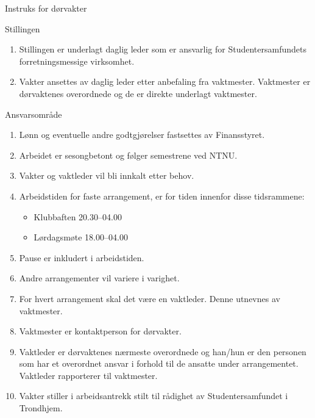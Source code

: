 \documentclass[fsbok.tex]{subfiles}
\begin{document}
\begin{instruks*}{Instruks for dørvakter}
    \begin{instruksledd}{Stillingen}
        \begin{enumerate}
            \item Stillingen er underlagt daglig leder som er ansvarlig for Studentersamfundets forretningsmessige virksomhet.
            \item Vakter ansettes av daglig leder etter anbefaling fra vaktmester. Vaktmester er dørvaktenes 
                overordnede og de er direkte underlagt vaktmester.
        \end{enumerate}    
    \end{instruksledd}

    \begin{instruksledd}{Ansvarsområde}
        \begin{enumerate}
            \item Lønn og eventuelle andre godtgjørelser fastsettes av Finansstyret.
            \item Arbeidet er sesongbetont og følger semestrene ved NTNU.
            \item Vakter og vaktleder vil bli innkalt etter behov.
            \item Arbeidstiden for faste arrangement, er for tiden innenfor disse tidsrammene:
                \begin{itemize}
                    \item Klubbaften 20.30--04.00
                    \item Lørdagsmøte 18.00--04.00
                \end{itemize}
            \item Pause er inkludert i arbeidstiden.
            \item Andre arrangementer vil variere i varighet.
            \item For hvert arrangement skal det være en vaktleder. Denne utnevnes av vaktmester.
            \item Vaktmester er kontaktperson for dørvakter.
            \item Vaktleder er dørvaktenes nærmeste overordnede og han/hun er den personen som har et overordnet ansvar i
                forhold til de ansatte under arrangementet. Vaktleder rapporterer til vaktmester.
            \item Vakter stiller i arbeidsantrekk stilt til rådighet av Studentersamfundet i Trondhjem.
        \end{enumerate}    
    \end{instruksledd}


\end{instruks*}
\end{document}
